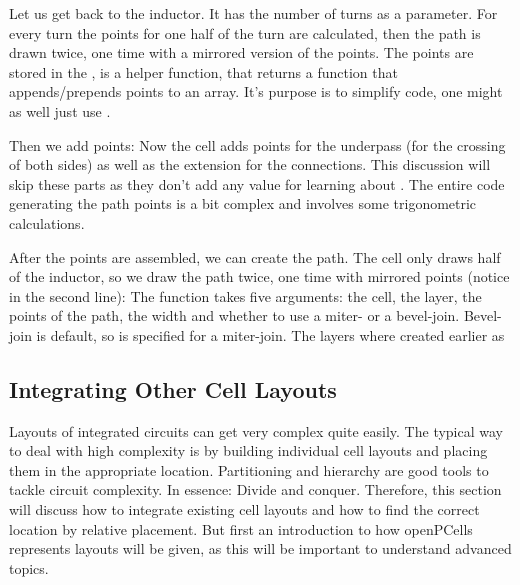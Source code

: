 \bigskip

Let us get back to the inductor.
It has the number of turns as a parameter.
For every turn the points for one half of the turn are calculated, then the path is drawn twice, one time with a mirrored version of the points.
The points are stored in the ,  is a helper function, that returns a function that appends/prepends points to an array.
It's purpose is to simplify code, one
might as well just use .

Then we add points:
Now the cell adds points for the underpass (for the crossing of both sides) as well as the extension for the connections.
This discussion will skip these parts as they don't add any value for learning about .
The entire code generating the path points is a bit complex and involves some trigonometric calculations.

After the points are assembled, we can create the path.
The cell only draws half of the inductor, so we draw the path twice, one time with mirrored points (notice
 in the second line):
The  function takes five arguments: the cell, the layer, the points of the path, the width and whether to use a miter- or a bevel-join.
Bevel-join is
default, so  is specified for a miter-join.
The layers where created earlier as

\subsection{Integrating Other Cell Layouts}
Layouts of integrated circuits can get very complex quite easily.
The typical way to deal with high complexity is by building individual cell layouts and placing them in the appropriate location.
Partitioning and hierarchy are good tools to tackle circuit complexity.
In essence: Divide and conquer.
Therefore, this section will discuss how to integrate existing cell layouts and how to find the correct location by relative placement.
But first an introduction to how openPCells represents layouts will be given, as this will be important to understand advanced topics.

